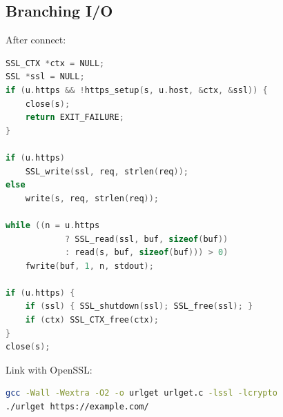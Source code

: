 \subsection{Branching I/O}

After connect:

\begin{lstlisting}[style=snippet,language=C]
SSL_CTX *ctx = NULL;
SSL *ssl = NULL;
if (u.https && !https_setup(s, u.host, &ctx, &ssl)) {
    close(s);
    return EXIT_FAILURE;
}

if (u.https)
    SSL_write(ssl, req, strlen(req));
else
    write(s, req, strlen(req));

while ((n = u.https
            ? SSL_read(ssl, buf, sizeof(buf))
            : read(s, buf, sizeof(buf))) > 0)
    fwrite(buf, 1, n, stdout);

if (u.https) {
    if (ssl) { SSL_shutdown(ssl); SSL_free(ssl); }
    if (ctx) SSL_CTX_free(ctx);
}
close(s);
\end{lstlisting}

Link with OpenSSL:

\begin{lstlisting}[style=snippet,language=bash]
gcc -Wall -Wextra -O2 -o urlget urlget.c -lssl -lcrypto
./urlget https://example.com/
\end{lstlisting}

